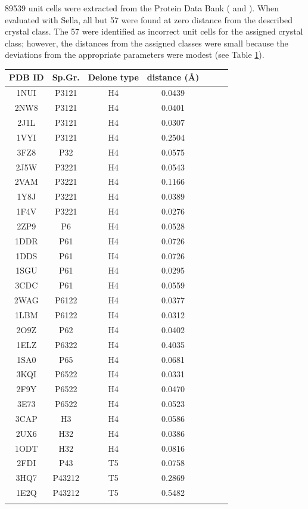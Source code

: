 \documentclass[preprint]{iucr}              %
\begin{document}
89539 unit cells were extracted from the Protein Data Bank 
( and ). 
When evaluated with Sella, all but 57 were found at zero 
distance from the described crystal class. The 57 were 
identified as incorrect unit cells for the assigned 
crystal class; however, the distances from the assigned 
classes were small because the deviations from the 
appropriate parameters were modest (see Table \ref{tab:PDBCells}).
\begin{table}
	\label{tab:PDBCells}
	
\begin{tabular}{ccccccc}
	\toprule
PDB ID & Sp.Gr. & Delone type&distance ({{\AA}}) \\ 
\midrule
		1NUI&P3121&H4&0.0439\\ 
		2NW8&P3121&H4&0.0401\\ 
		2J1L&P3121&H4&0.0307\\ 
		1VYI&P3121&H4&0.2504\\ 
		3FZ8&P32&H4&0.0575\\ 
		2J5W&P3221&H4&0.0543\\ 
		2VAM&P3221&H4&0.1166\\ 
		1Y8J&P3221&H4&0.0389\\ 
		1F4V&P3221&H4&0.0276\\ 
		2ZP9&P6&H4&0.0528\\ 
		1DDR&P61&H4&0.0726\\ 
		1DDS&P61&H4&0.0726\\ 
		1SGU&P61&H4&0.0295\\ 
		3CDC&P61&H4&0.0559\\ 
		2WAG&P6122&H4&0.0377\\ 
		1LBM&P6122&H4&0.0312\\ 
		2O9Z&P62&H4&0.0402\\ 
		1ELZ&P6322&H4&0.4035\\ 
		1SA0&P65&H4&0.0681\\ 
		3KQI&P6522&H4&0.0331\\ 
		2F9Y&P6522&H4&0.0470\\ 
		3E73&P6522&H4&0.0523\\ 
		3CAP&H3&H4&0.0586\\ 
		2UX6&H32&H4&0.0386\\ 
		1ODT&H32&H4&0.0816\\ 
		2FDI&P43&T5&0.0758\\ 
		3HQ7&P43212&T5&0.2869\\ 
		1E2Q&P43212&T5&0.5482\\ \\

\end{tabular}
\end{table}
\end{document}
